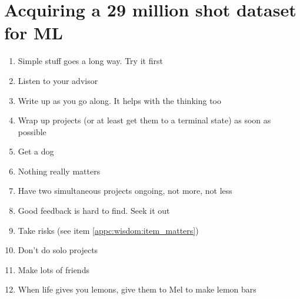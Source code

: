 \graphicspath{{../Thesis/Appendix/appendix_29m-shots/}}

\chapter{Acquiring a 29 million shot dataset for ML}
\label{app:29m}

\begin{enumerate}
	\item Simple stuff goes a long way. Try it first
	\item Listen to your advisor
	\item Write up as you go along. It helps with the thinking too
	\item Wrap up projects (or at least get them to a terminal state) as soon as possible
	\item Get a dog
	\item Nothing really matters \label{appc:wisdom:item_matters}
	\item Have two simultaneous projects ongoing, not more, not less
	\item Good feedback is hard to find. Seek it out
	\item Take risks (see item \ref{appc:wisdom:item_matters})
	\item Don't do solo projects
	\item Make lots of friends
	\item When life gives you lemons, give them to Mel to make lemon bars
\end{enumerate}
